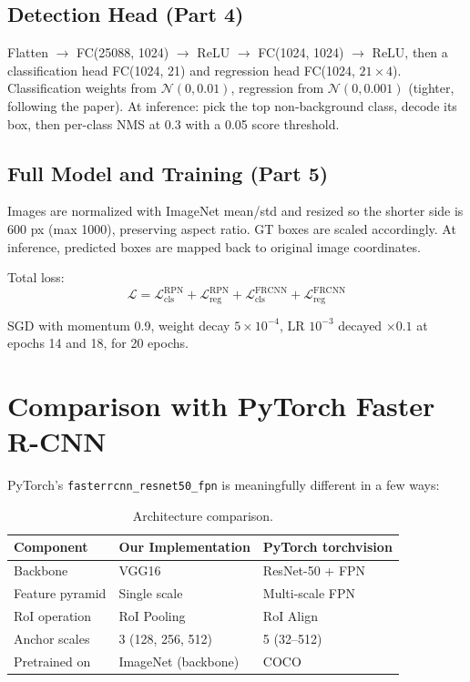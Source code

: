 \documentclass[11pt]{article}
\begin{document}
\subsection{Detection Head (Part 4)}

Flatten $\to$ FC(25088, 1024) $\to$ ReLU $\to$ FC(1024, 1024) $\to$ ReLU, then a classification head FC(1024, 21) and regression head FC(1024, $21\times4$). Classification weights from $\mathcal{N}(0, 0.01)$, regression from $\mathcal{N}(0, 0.001)$ (tighter, following the paper). At inference: pick the top non-background class, decode its box, then per-class NMS at 0.3 with a 0.05 score threshold.

\subsection{Full Model and Training (Part 5)}

Images are normalized with ImageNet mean/std and resized so the shorter side is 600 px (max 1000), preserving aspect ratio. GT boxes are scaled accordingly. At inference, predicted boxes are mapped back to original image coordinates.

Total loss:
\begin{equation}
    \mathcal{L} = \mathcal{L}_\text{cls}^\text{RPN} + \mathcal{L}_\text{reg}^\text{RPN} + \mathcal{L}_\text{cls}^\text{FRCNN} + \mathcal{L}_\text{reg}^\text{FRCNN}
\end{equation}

SGD with momentum 0.9, weight decay $5\times10^{-4}$, LR $10^{-3}$ decayed $\times0.1$ at epochs 14 and 18, for 20 epochs.

\section{Comparison with PyTorch Faster R-CNN}

PyTorch's \texttt{fasterrcnn\_resnet50\_fpn} is meaningfully different in a few ways:

\begin{table}[H]
\centering
\begin{tabular}{lll}
\toprule
\textbf{Component} & \textbf{Our Implementation} & \textbf{PyTorch torchvision} \\
\midrule
Backbone        & VGG16               & ResNet-50 + FPN \\
Feature pyramid & Single scale        & Multi-scale FPN \\
RoI operation   & RoI Pooling         & RoI Align \\
Anchor scales   & 3 (128, 256, 512)   & 5 (32--512) \\
Pretrained on   & ImageNet (backbone) & COCO \\
\bottomrule
\end{tabular}
\caption{Architecture comparison.}
\end{table}
\end{document}
